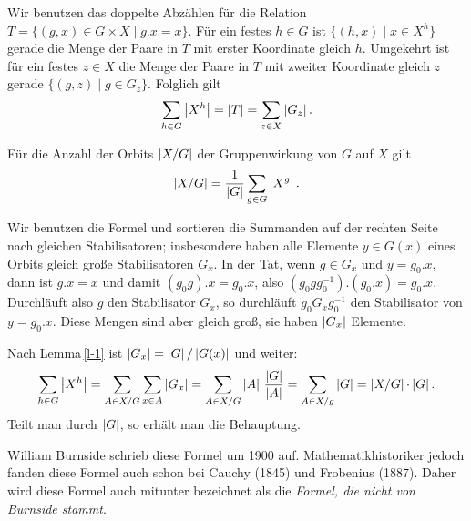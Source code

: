\documentclass[12pt,a4paper]{article}
\begin{document}
\begin{beweis}
Wir benutzen das doppelte Abzählen für die Relation $T=\{(g,x)\in G\times
X\mid g.x = x\}$.  Für ein festes $h\in G$ ist $\{(h,x)\mid x\in X^{h}\}$
gerade die Menge der Paare in $T$ mit erster Koordinate gleich $h$. Umgekehrt
ist für ein festes $z\in X$ die Menge der Paare in $T$ mit zweiter Koordinate
gleich $z$ gerade $\{(g,z)\mid g\in G_z\}$. Folglich gilt
\begin{gather*}
  \sum_{h\in G} \left\vert X^h\right\vert =\left\vert T\right\vert =\sum_{z\in X} \left\vert  G_z\right\vert.
\end{gather*}
\end{beweis}

\begin{lemma}
\label{l-burnside}
Für die Anzahl der Orbits $\left\vert X/G\right\vert$ der Gruppenwirkung von $G$ auf $X$ gilt
\begin{align}\label{e-burn}
\left\vert X/G\right\vert =\frac{1}{\left\vert G\right\vert } \sum_{g\in G} \left\vert X^g\right\vert.
\end{align}
\end{lemma}

\begin{beweis} 
Wir benutzen die Formel \rf[e-s-o] und sortieren die Summanden auf der rechten
Seite nach gleichen Stabilisatoren; insbesondere haben alle Elemente $y\in
G(x)$ eines Orbits gleich große Stabilisatoren $G_x$. In der Tat, wenn $g\in
G_x$ und $y=g_0. x$, dann ist $g.x=x $ und damit $(g_0 g).x =g_0.x$, also
$(g_0g g_0^{-1}).(g_0.x ) = g_0.x$. Durchläuft also $g$ den Stabilisator
$G_x$, so durchläuft $g_0 G_x g_0^{-1} $ den Stabilisator von $y=g_0.x$.
Diese Mengen sind aber gleich groß, sie haben $\left\vert G_x\right\vert $ Elemente.

Nach Lemma\,\ref{l-1} ist $\left\vert G_x\right\vert= \left\vert G\right\vert /\left\vert G(x)\right\vert $ und weiter:
\begin{gather*}
  \sum_{h\in G} \left\vert X^ h\right\vert =\sum_{A\in X/G} \sum_{x\in A} \left\vert G_x\right\vert = \sum
  _{A\in X/G} \left\vert A\right\vert\,\frac{\left\vert G\right\vert}{\left\vert A\right\vert}= \sum_{A\in X/g} \left\vert G\right\vert
  =\left\vert X/G\right\vert{\cdot } \left\vert G\right\vert.
\end{gather*}
Teilt man durch $\left\vert G\right\vert$, so erhält man die Behauptung.
\end{beweis}

\begin{bemerkung}
William Burnside schrieb diese Formel um 1900 auf. Mathematikhistoriker jedoch
fanden diese Formel auch schon bei Cauchy (1845) und Frobenius (1887). Daher
wird diese Formel auch mitunter bezeichnet als die {\em Formel, die nicht von
  Burnside stammt}.
\end{bemerkung}
\end{document}
